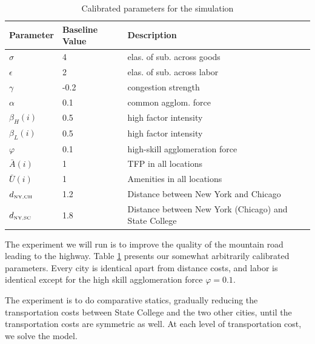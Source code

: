 \documentclass{article}
\begin{document}
\begin{table}
\centering
\begin{tabular}{lll}
\hline \hline
Parameter               & Baseline Value & Description                                           \\ \hline
$\sigma$                & 4              & elas. of sub. across goods                            \\
$\epsilon$              & 2              & elas. of sub. across labor                            \\
$\gamma$                & -0.2           & congestion strength                                   \\
$\alpha$                & 0.1            & common agglom. force                                  \\
$\beta_H(i)$            & 0.5            & high factor intensity                                 \\
$\beta_L(i)$            & 0.5            & high factor intensity                                 \\
$\varphi$               & 0.1            & high-skill agglomeration force                        \\
$\bar{A}(i)$            & 1              & TFP in all locations                                  \\
$\bar{U}(i)$            & 1              & Amenities in all locations                            \\
$d_{\tiny \mbox{NY,CH}}$ & 1.2            & Distance between New York and Chicago                 \\
$d_{\tiny \mbox{NY,SC}}$ & 1.8            & Distance between New York (Chicago) and State College \\
\hline
\end{tabular}
\caption{Calibrated parameters for the simulation}
\label{tab:cal_par}
\end{table}

The experiment we will run is to improve the quality of the mountain road leading to the highway.  Table \ref{tab:cal_par} presents our somewhat arbitrarily calibrated parameters.  Every city is identical apart from distance costs, and labor is identical except for the high skill agglomeration force $\varphi = 0.1$.

The experiment is to do comparative statics, gradually reducing the transportation costs between State College and the two other cities, until the transportation costs are symmetric as well.  At each level of transportation cost, we solve the model.
\end{document}
